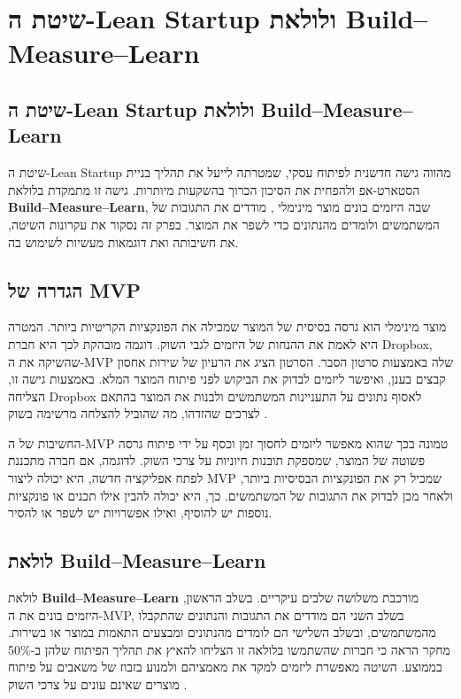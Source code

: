 \chapter{שיטת ה-Lean Startup ולולאת Build–Measure–Learn}

\section{שיטת ה-Lean Startup ולולאת Build–Measure–Learn}

שיטת ה-Lean Startup מהווה גישה חדשנית לפיתוח עסקי, שמטרתה לייעל את תהליך בניית הסטארט-אפ ולהפחית את הסיכון הכרוך בהשקעות מיותרות. גישה זו מתמקדת בלולאת \textbf{Build–Measure–Learn}, שבה היזמים בונים מוצר מינימלי , מודדים את התגובות של המשתמשים ולומדים מהנתונים כדי לשפר את המוצר. בפרק זה נסקור את עקרונות השיטה, את חשיבותה ואת דוגמאות מעשיות לשימוש בה.

\section{הגדרה של MVP}

מוצר מינימלי  הוא גרסה בסיסית של המוצר שמכילה את הפונקציות הקריטיות ביותר. המטרה היא לאמת את ההנחות של היזמים לגבי השוק. דוגמה מובהקת לכך היא חברת Dropbox, שהשיקה את ה-MVP שלה באמצעות סרטון הסבר. הסרטון הציג את הרעיון של שירות אחסון קבצים בענן, ואיפשר ליזמים לבדוק את הביקוש לפני פיתוח המוצר המלא. באמצעות גישה זו, הצליחה Dropbox לאסוף נתונים על התעניינות המשתמשים ולבנות את המוצר בהתאם לצרכים שהזדהו, מה שהוביל להצלחה מרשימה בשוק \cite{ries2011lean}.

החשיבות של ה-MVP טמונה בכך שהוא מאפשר ליזמים לחסוך זמן וכסף על ידי פיתוח גרסה פשוטה של המוצר, שמספקת תובנות חיוניות על צרכי השוק. לדוגמה, אם חברה מתכננת לפתח אפליקציה חדשה, היא יכולה ליצור MVP שמכיל רק את הפונקציות הבסיסיות ביותר, ולאחר מכן לבדוק את התגובות של המשתמשים. כך, היא יכולה להבין אילו תכנים או פונקציות נוספות יש להוסיף, ואילו אפשרויות יש לשפר או להסיר.

\section{לולאת Build–Measure–Learn}

לולאת \textbf{Build–Measure–Learn} מורכבת משלושה שלבים עיקריים. בשלב הראשון, היזמים בונים את ה-MVP, בשלב השני הם מודדים את התגובות והנתונים שהתקבלו מהמשתמשים, ובשלב השלישי הם לומדים מהנתונים ומבצעים התאמות במוצר או בשירות. מחקר הראה כי חברות שהשתמשו בלולאה זו הצליחו להאיץ את תהליך הפיתוח שלהן ב-50\% בממוצע. השיטה מאפשרת ליזמים למקד את מאמציהם ולמנוע בזבוז של משאבים על פיתוח מוצרים שאינם עונים על צרכי השוק \cite{blank2013startup}.

